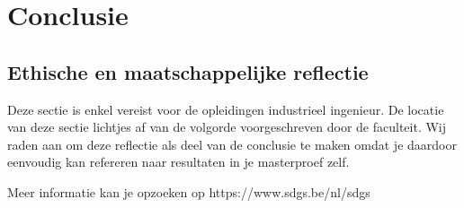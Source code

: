 \chapter*{Conclusie}

\lipsum[2-4]

\section*{Ethische en maatschappelijke reflectie}

Deze sectie is enkel vereist voor de opleidingen industrieel ingenieur. De locatie van deze sectie lichtjes af van de volgorde voorgeschreven door de faculteit. Wij raden aan om deze reflectie als deel van de conclusie te maken omdat je daardoor eenvoudig kan refereren naar resultaten in je masterproef zelf.

Meer informatie kan je opzoeken op https://www.sdgs.be/nl/sdgs


\lipsum[2-4]
